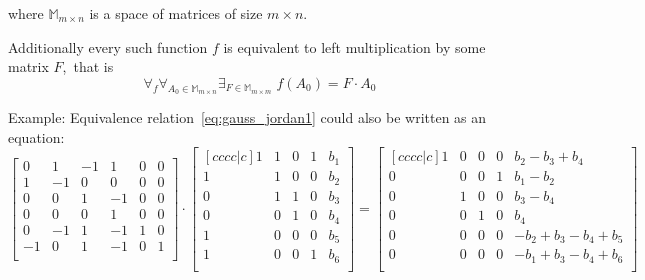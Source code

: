 \begin{description}
\begin{description}
            where $\mathbb{M}_{m \times n}$ is a space of matrices of size $m \times n$.

            Additionally every such function $f$ is equivalent to left multiplication by some matrix $F$,~that is
            {\large 
            \begin{equation}
                \forall_{f} \forall_{A_0 \in \mathbb{M}_{m \times n}} \exists_{F \in \mathbb{M}_{m \times m}} \; f(A_0) = F \cdot A_0
            \end{equation}
            }

            Example: Equivalence relation~\ref{eq:gauss_jordan1} could also be written as an equation:
            \begin{equation}
            \begin{bmatrix}
                0 & 1 & -1 & 1 & 0 & 0 \\
                1 & -1 & 0 & 0 & 0 & 0 \\
                0 & 0 & 1 & -1 & 0 & 0 \\ 
                0 & 0 & 0 & 1 & 0 & 0 \\ 
                0 & -1 & 1 & -1 & 1 & 0 \\ 
                -1 & 0 & 1 & -1 & 0 & 1 \\ 
            \end{bmatrix} \cdot
            \begin{bmatrix}[cccc|c]
                1 & 1 & 0 & 1 & b_1 \\
                1 & 1 & 0 & 0 & b_2 \\
                0 & 1 & 1 & 0 & b_3 \\ 
                0 & 0 & 1 & 0 & b_4 \\ 
                1 & 0 & 0 & 0 & b_5 \\ 
                1 & 0 & 0 & 1 & b_6 \\ 
            \end{bmatrix} =
            \begin{bmatrix}[cccc|c]
                1 & 0 & 0 & 0 & b_2 - b_3 + b_4 \\
                0 & 0 & 0 & 1 & b_1 - b_2 \\
                0 & 1 & 0 & 0 & b_3 - b_4 \\ 
                0 & 0 & 1 & 0 & b_4 \\ 
                0 & 0 & 0 & 0 & -b_2 + b_3 - b_4 + b_5 \\ 
                0 & 0 & 0 & 0 & -b_1 + b_3 - b_4 + b_6 \\ 

\end{bmatrix}
\end{equation}
\end{description}
\end{description}
